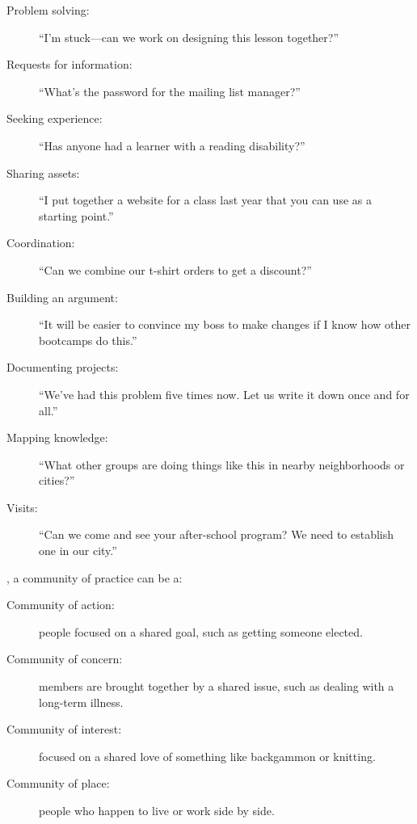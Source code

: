 \newpage
\begin{description}

\item[Problem solving:]
  ``I'm stuck---can we work on designing this lesson together?''

\item[Requests for information:]
  ``What's the password for the mailing list manager?''

\item[Seeking experience:]
  ``Has anyone had a learner with a reading disability?''

\item[Sharing assets:]
  ``I put together a website for a class last year that you can use as a starting point.''

\item[Coordination:]
  ``Can we combine our t-shirt orders to get a discount?''

\item[Building an argument:]
  ``It will be easier to convince my boss to make changes if I know how other bootcamps do this.''

\item[Documenting projects:]
  ``We've had this problem five times now. Let us write it down once and for all.''

\item[Mapping knowledge:]
  ``What other groups are doing things like this in nearby neighborhoods or cities?''

\item[Visits:]
  ``Can we come and see your after-school program? We need to establish one in our city.''

\end{description}

,
a community of practice can be a:

\begin{description}

\item[Community of action:]
  people focused on a shared goal,
  such as getting someone elected.

\item[Community of concern:]
  members are brought together by a shared issue,
  such as dealing with a long-term illness.

\item[Community of interest:]
  focused on a shared love of something like backgammon or knitting.

\item[Community of place:]
  people who happen to live or work side by side.

\end{description}

